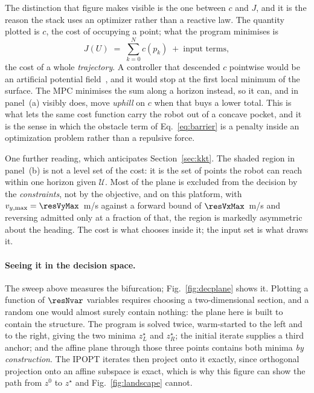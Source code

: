 \documentclass[11pt,a4paper]{article}
\begin{document}
The distinction that figure makes visible is the one between $c$ and $J$, and it is the reason the stack
uses an optimizer rather than a reactive law. The quantity plotted is $c$, the cost of occupying a point;
what the program minimises is
\begin{equation}
  J(U) \;=\; \sum_{k=0}^{N} c(p_k) \;+\; \text{input terms},
  \label{eq:candJ}
\end{equation}
the cost of a whole \emph{trajectory}. A controller that descended $c$ pointwise would be an artificial
potential field~\cite{khatib1986potential}, and it would stop at the first local minimum of the surface. The MPC minimises the sum
along a horizon instead, so it can, and in panel~(a) visibly does, move \emph{uphill} on $c$ when that
buys a lower total. This is what lets the same cost function carry the robot out of a concave pocket, and it
is the sense in which the obstacle term of Eq.~\eqref{eq:barrier} is a penalty inside an optimization
problem rather than a repulsive force.

One further reading, which anticipates Section~\ref{sec:kkt}. The shaded region in panel~(b) is not a level
set of the cost: it is the set of points the robot can reach within one horizon given $\mathcal{U}$. Most of
the plane is excluded from the decision by the \emph{constraints}, not by the objective, and on this
platform, with $v_{y,\max}=\resVyMax$~m/s against a forward bound of $\resVxMax$~m/s and reversing
admitted only at a fraction of that, the region is markedly asymmetric about
the heading. The cost is what chooses inside it; the input set is what draws it.

\paragraph{Seeing it in the decision space.} The sweep above measures the bifurcation; Fig.~\ref{fig:decplane}
shows it. Plotting a function of $\resNvar$ variables requires choosing a two-dimensional section, and a
random one would almost surely contain nothing: the plane here is built to contain the structure. The program
is solved twice, warm-started to the left and to the right, giving the two minima $z^\star_L$ and $z^\star_R$;
the initial iterate supplies a third anchor; and the affine plane through those three points contains both
minima \emph{by construction}. The IPOPT iterates then project onto it exactly, since orthogonal projection
onto an affine subspace is exact, which is why this figure can show the path from $z^0$ to $z^\star$ and
Fig.~\ref{fig:landscape} cannot.
\end{document}
